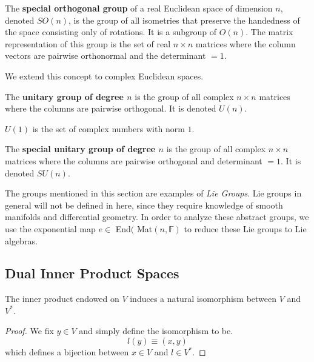  \begin{definition}
    The \textbf{special orthogonal group} of a real Euclidean space of dimension $n$, denoted $SO(n)$, is the group of all isometries that preserve the handedness of the space consisting only of rotations. It is a subgroup of $O(n)$. The matrix representation of this group is the set of real $n \times n$ matrices where the column vectors are pairwise orthonormal and the determinant $=1$. 
  \end{definition}

  We extend this concept to complex Euclidean spaces. 

  \begin{definition}
    The \textbf{unitary group of degree $n$} is the group of all complex $n \times n$ matrices where the columns are pairwise orthogonal. It is denoted $U(n)$. 
  \end{definition}

  \begin{example}
    $U(1)$ is the set of complex numbers with norm $1$. 
  \end{example}

  \begin{definition}
    The \textbf{special unitary group of degree $n$} is the group of all complex $n \times n$ matrices where the columns are pairwise orthogonal and determinant $=1$. It is denoted $SU(n)$. 
  \end{definition}

  The groups mentioned in this section are examples of \textit{Lie Groups}. Lie groups in general will not be defined in here, since they require knowledge of smooth manifolds and differential geometry. In order to analyze these abstract groups, we use the exponential map $e \in$ End$($ Mat$(n, \mathbb{F})$ to reduce these Lie groups to Lie algebras.

\subsection{Dual Inner Product Spaces}

  \begin{theorem}
    The inner product endowed on $V$ induces a natural isomorphism between $V$ and $V^\ast$. 
  \end{theorem}
  \begin{proof}
    We fix $y \in V$ and simply define the isomorphism to be. 
    \begin{equation}
      l(y) \equiv (x, y)
    \end{equation}
    which defines a bijection between $x \in V$ and $l \in V^*$. 
  \end{proof}

